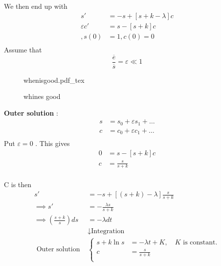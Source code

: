 \documentclass{article}
\newcommand{\incfig}[2][1]{%
\def\svgwidth{#1\columnwidth}
{#2.pdf_tex} } \pdfsuppresswarningpagegroup=1
\theoremstyle{remark}
\begin{document}
\begin{enumerate}[label=(\roman*)]
We then end up with \[
  \begin{split}
s'  &=  -s + \left[ s + k - \lambda  \right]c \\
\varepsilon c'  &=  s - \left[ s + k  \right] c \\ , 
s(0) &= 1 , c\left( 0 \right) = 0 \\
  \end{split} 
\] 
 Assume that \[
 \frac{\overline{e} }{\overline{s}  }  = \varepsilon  \ll  1
 \] 
\begin{figure}[ht]
    \centering
    \incfig{whenisgood}
    \caption{whines good}
    \label{fig:whenisgood}
\end{figure}


\textbf{Outer solution} : \[
  \begin{split}
 s  & = s_{0} + \varepsilon  s_{1} + \ldots \\
 c &=  c_{0} + \varepsilon  c_{1} + \ldots \\
  \end{split} 
\] 
Put $\varepsilon  = 0$ . This gives \[
\begin{split}
  0 &=  s - \left[ s+ k \right]c \\
  c&= \frac{s}{s+ k} \\
\end{split} 
\] 

C is then \[
  \begin{split}
s'  &=  -s + \left[ \left( s+ k \right) - \lambda  \right] \frac{s}{s+k}  \\
\implies  s'  &=  - \frac{\lambda s}{s + k}  \\
\implies  \left( \frac{s + k}{ s}  \right) ds &=  - \lambda  dt \\
 & \downarrow    \text{Integration} \\
\text{ Outer solution }  & 
\begin{cases}
s + k \ln s &=  -\lambda  t + K , \quad  K \text{ is constant.}  \\
c &=  \frac{s}{s + k} \\
\end{cases}
  \end{split} 
\] 


\end{enumerate}
\end{document}
